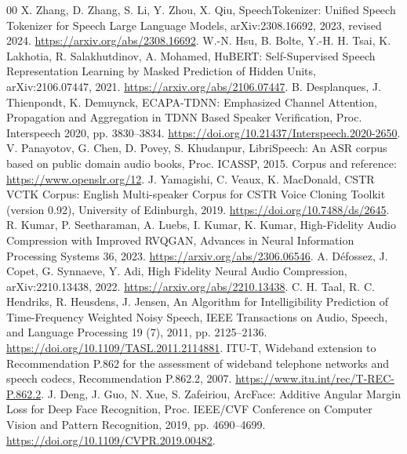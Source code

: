 \begin{thebibliography}{00}
X. Zhang, D. Zhang, S. Li, Y. Zhou, X. Qiu,
SpeechTokenizer: Unified Speech Tokenizer for Speech Large Language Models,
arXiv:2308.16692, 2023, revised 2024.
\url{https://arxiv.org/abs/2308.16692}.
W.-N. Hsu, B. Bolte, Y.-H. H. Tsai, K. Lakhotia, R. Salakhutdinov, A. Mohamed,
HuBERT: Self-Supervised Speech Representation Learning by Masked Prediction of Hidden Units,
arXiv:2106.07447, 2021.
\url{https://arxiv.org/abs/2106.07447}.
B. Desplanques, J. Thienpondt, K. Demuynck,
ECAPA-TDNN: Emphasized Channel Attention, Propagation and Aggregation in TDNN Based Speaker Verification,
Proc. Interspeech 2020, pp. 3830--3834.
\url{https://doi.org/10.21437/Interspeech.2020-2650}.
V. Panayotov, G. Chen, D. Povey, S. Khudanpur,
LibriSpeech: An ASR corpus based on public domain audio books,
Proc. ICASSP, 2015. Corpus and reference:
\url{https://www.openslr.org/12}.
J. Yamagishi, C. Veaux, K. MacDonald,
CSTR VCTK Corpus: English Multi-speaker Corpus for CSTR Voice Cloning Toolkit (version 0.92),
University of Edinburgh, 2019.
\url{https://doi.org/10.7488/ds/2645}.
R. Kumar, P. Seetharaman, A. Luebs, I. Kumar, K. Kumar,
High-Fidelity Audio Compression with Improved RVQGAN,
Advances in Neural Information Processing Systems 36, 2023.
\url{https://arxiv.org/abs/2306.06546}.
A. D\'efossez, J. Copet, G. Synnaeve, Y. Adi,
High Fidelity Neural Audio Compression,
arXiv:2210.13438, 2022.
\url{https://arxiv.org/abs/2210.13438}.
C. H. Taal, R. C. Hendriks, R. Heusdens, J. Jensen,
An Algorithm for Intelligibility Prediction of Time-Frequency Weighted Noisy Speech,
IEEE Transactions on Audio, Speech, and Language Processing 19 (7), 2011, pp. 2125--2136.
\url{https://doi.org/10.1109/TASL.2011.2114881}.
ITU-T, Wideband extension to Recommendation P.862 for the assessment of wideband telephone networks and speech codecs,
Recommendation P.862.2, 2007.
\url{https://www.itu.int/rec/T-REC-P.862.2}.
J. Deng, J. Guo, N. Xue, S. Zafeiriou,
ArcFace: Additive Angular Margin Loss for Deep Face Recognition,
Proc. IEEE/CVF Conference on Computer Vision and Pattern Recognition, 2019, pp. 4690--4699.
\url{https://doi.org/10.1109/CVPR.2019.00482}.
\end{thebibliography}
